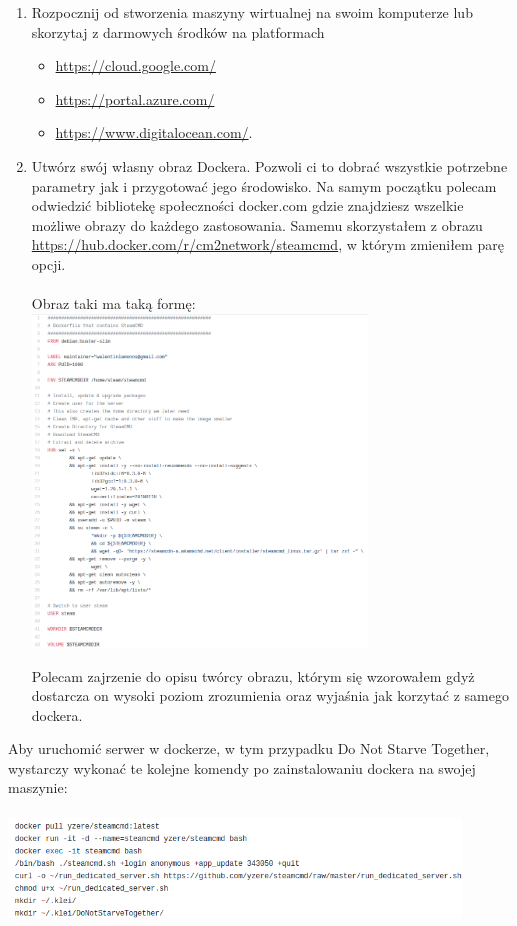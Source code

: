 \documentclass[10pt,a4paper]{report}
\begin{document}
\begin{enumerate}
\item Rozpocznij od stworzenia maszyny wirtualnej na swoim komputerze lub skorzytaj z darmowych środków na platformach 
\begin{itemize}
\item \url{https://cloud.google.com/}
\item \url{https://portal.azure.com/}
\item \url{https://www.digitalocean.com/}.
\end{itemize}
\item Utwórz swój własny obraz Dockera. Pozwoli ci to dobrać wszystkie potrzebne parametry jak i przygotować jego środowisko. Na samym początku polecam odwiedzić bibliotekę społeczności docker.com gdzie znajdziesz wszelkie możliwe obrazy do każdego zastosowania. Samemu skorzystałem z obrazu \url{https://hub.docker.com/r/cm2network/steamcmd}, w którym zmieniłem parę opcji. \\\\
Obraz taki ma taką formę:\\
\includegraphics[width=0.7\textwidth, center]{docker.png}

Polecam zajrzenie do opisu twórcy obrazu, którym się wzorowałem gdyż dostarcza on wysoki poziom zrozumienia oraz wyjaśnia jak korzytać z samego dockera. 
\end{enumerate}
Aby uruchomić serwer w dockerze, w tym przypadku Do Not Starve Together, wystarczy wykonać te kolejne komendy po zainstalowaniu dockera na swojej maszynie:\\\\
\includegraphics[width=0.9\textwidth, center]{run.png}\\\\
\end{document}
